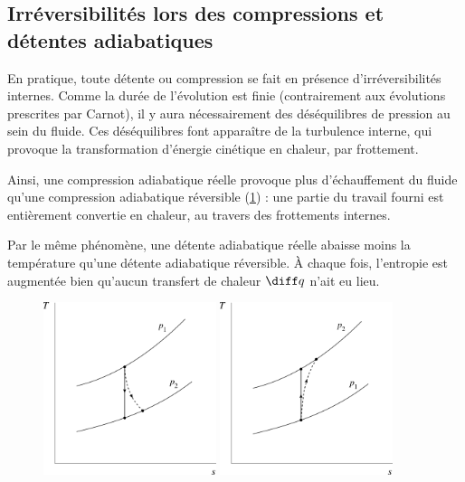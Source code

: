 		\subsection{Irréversibilités lors des compressions et détentes adiabatiques}

		En pratique, toute détente ou compression se fait en présence d’irréversibilités internes. Comme la durée de l’évolution est finie (contrairement aux évolutions prescrites par Carnot), il y aura nécessairement des déséquilibres de pression au sein du fluide. Ces déséquilibres font apparaître de la turbulence interne, qui provoque la transformation d’énergie cinétique en chaleur, par frottement.

		Ainsi, une compression adiabatique réelle provoque plus d’échauffement du fluide qu’une compression adiabatique réversible (\cref{fig_t-s_détentes_compressions}) : une partie du travail fourni est entièrement convertie en chaleur, au travers des frottements internes.

		Par le même phénomène, une détente adiabatique réelle abaisse moins la température qu’une détente adiabatique réversible. À chaque fois, l’entropie est augmentée bien qu’aucun transfert de chaleur $\diff q$ n’ait eu lieu.
		
		\begin{figure}
			\begin{center}
				\includegraphics[width=0.45\textwidth]{images/ts_gp_detente.png}
				\includegraphics[width=0.45\textwidth]{images/ts_gp_compression.png}
			\end{center}
			\label{fig_t-s_détentes_compressions}
		\end{figure}

